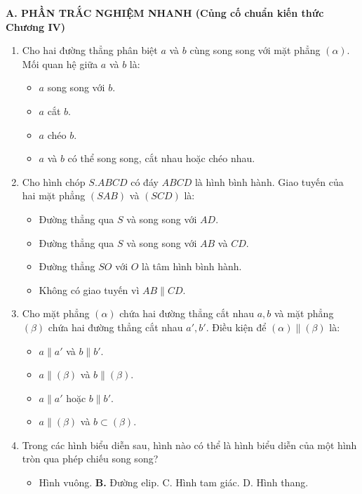 \documentclass[12pt, a4paper]{article}
\begin{document}
\noindent \textbf{A. PHẦN TRẮC NGHIỆM NHANH (Củng cố chuẩn kiến thức Chương IV)}
\begin{enumerate}[leftmargin=0.6cm]
    \item Cho hai đường thẳng phân biệt $a$ và $b$ cùng song song với mặt phẳng $(\alpha)$. Mối quan hệ giữa $a$ và $b$ là:
    \begin{itemize}[leftmargin=0.6cm]
        \item[A.] $a$ song song với $b$.
        \item[B.] $a$ cắt $b$.
        \item[C.] $a$ chéo $b$.
        \item[\textbf{D.}] $a$ và $b$ có thể song song, cắt nhau hoặc chéo nhau.
    \end{itemize}

    \item Cho hình chóp $S.ABCD$ có đáy $ABCD$ là hình bình hành. Giao tuyến của hai mặt phẳng $(SAB)$ và $(SCD)$ là:
    \begin{itemize}[leftmargin=0.6cm]
        \item[A.] Đường thẳng qua $S$ và song song với $AD$.
        \item[\textbf{B.}] Đường thẳng qua $S$ và song song với $AB$ và $CD$.
        \item[C.] Đường thẳng $SO$ với $O$ là tâm hình bình hành.
        \item[D.] Không có giao tuyến vì $AB \parallel CD$.
    \end{itemize}

    \item Cho mặt phẳng $(\alpha)$ chứa hai đường thẳng cắt nhau $a, b$ và mặt phẳng $(\beta)$ chứa hai đường thẳng cắt nhau $a', b'$. Điều kiện để $(\alpha) \parallel (\beta)$ là:
    \begin{itemize}[leftmargin=0.6cm]
        \item[A.] $a \parallel a'$ và $b \parallel b'$.
        \item[\textbf{B.}] $a \parallel (\beta)$ và $b \parallel (\beta)$.
        \item[C.] $a \parallel a'$ hoặc $b \parallel b'$.
        \item[D.] $a \parallel (\beta)$ và $b \subset (\beta)$.
    \end{itemize}

    \item Trong các hình biểu diễn sau, hình nào có thể là hình biểu diễn của một hình tròn qua phép chiếu song song?
    \begin{itemize}[leftmargin=0.6cm]
        \item[A.] Hình vuông. \quad \textbf{B.} Đường elip. \quad C. Hình tam giác. \quad D. Hình thang.
    \end{itemize}
\end{enumerate}
\end{document}
